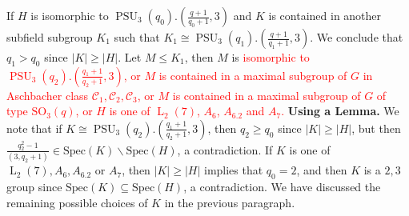 \documentclass[12pt,reqno]{amsart}
\newcommand{\PSU}{\operatorname{PSU}}
\newcommand{\LL}{\operatorname{L}}
\theoremstyle{plain}
\theoremstyle{definition}
\begin{document}
  If $H$ is isomorphic to $\PSU_3(q_0).(\frac{q+1}{q_0+1},3)$ and $K$ is contained in another subfield subgroup $K_1$ such that $K_1\cong \PSU_3(q_1).(\frac{q+1}{q_1+1},3)$.
  We conclude that $q_1>q_0$ since $|K|\ge |H|$. 
   Let $M\le K_1$, then $M$ is \textcolor{red}{isomorphic to $\PSU_3(q_2).(\frac{q_1+1}{q_2+1},3)$, or $M$ is contained in a maximal subgroup of $G$ in Aschbacher class $\mathcal{C}_1,\mathcal{C}_2,\mathcal{C}_3$, or $M$ is contained in a maximal subgroup of $G$ of type $\mathrm{SO}_3(q)$, or $H$ is one of $\LL_2(7)$, $A_6$, $A_6.2$ and $A_7$.  } \textbf{Using a Lemma.}
   We note that if $K\cong \PSU_3(q_2).(\frac{q_1+1}{q_2+1},3)$, then $q_2\ge q_0$ since $|K|\ge |H|$, but then $\frac{q_2^2-1}{(3,q_2+1)}\in \mathrm{Spec}(K)\backslash\mathrm{Spec}(H)$, a contradiction.
   If $K$ is one of $\LL_2(7), A_6, A_6.2$ or $A_7$, then $|K|\ge |H|$ implies that $q_0=2$, and then $K$ is a $2,3$ group since $\mathrm{Spec}(K)\subseteq \mathrm{Spec}(H)$, a contradiction. 
   We have discussed the remaining possible choices of $K$ in the previous paragraph.
   
\end{document}
